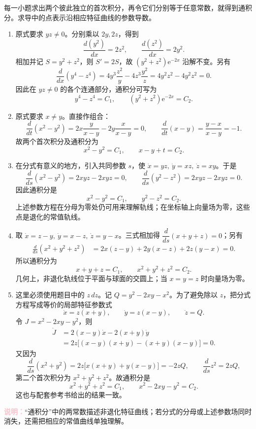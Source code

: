 \documentclass[UTF8,a4paper,11pt]{ctexart}
\newcommand{\e}{\mathrm e}
\newcommand{\note}[1]{\par\smallskip\noindent\textcolor{pink}{\bfseries 说明：}#1\par\smallskip}
\begin{document}
\begin{solution}
每一小题求出两个彼此独立的首次积分，再令它们分别等于任意常数，就得到通积分。求导中的点表示沿相应特征曲线的参数导数。
\begin{enumerate}[label=(\arabic*)]
\item 原式要求 $yz\ne0$。分别乘以 $2y,2z$，得到
\[
\frac{d(y^2)}{dx}=2z^2,\qquad
\frac{d(z^2)}{dx}=2y^2.
\]
相加并记 $S=y^2+z^2$，则 $S'=2S$，故
$(y^2+z^2)\e^{-2x}$ 沿解不变。另有
\[
\frac{d}{dx}(y^4-z^4)
=4y^3\frac{z^2}{y}-4z^3\frac{y^2}{z}
=4y^2z^2-4y^2z^2=0.
\]
因此在 $yz\ne0$ 的各个连通部分，通积分可写为
\[
\boxed{y^4-z^4=C_1,\qquad (y^2+z^2)\e^{-2x}=C_2.}
\]

\item 原式要求 $x\ne y$。直接作组合：
\[
\frac{d}{dt}(x^2-y^2)
=2x\frac{y}{x-y}-2y\frac{x}{x-y}=0,
\qquad
\frac{d}{dt}(x-y)=\frac{y-x}{x-y}=-1.
\]
故两个首次积分及通积分为
\[
\boxed{x^2-y^2=C_1,\qquad x-y+t=C_2.}
\]

\item 在分式有意义的地方，引入共同参数 $s$，使
$\dot x=yz,\ \dot y=xz,\ \dot z=xy$。于是
\[
\frac{d}{ds}(x^2-y^2)=2xyz-2xyz=0,\qquad
\frac{d}{ds}(y^2-z^2)=2xyz-2xyz=0.
\]
因此通积分是
\[
\boxed{x^2-y^2=C_1,\qquad y^2-z^2=C_2.}
\]
上述参数方程在分母为零处仍可用来理解轨线；在坐标轴上向量场为零，这些点是退化的常值轨线。

\item 取 $\dot x=z-y,\ \dot y=x-z,\ \dot z=y-x$。三式相加得
$\dfrac{d}{ds}(x+y+z)=0$；另有
\[
\begin{aligned}
\frac{d}{ds}(x^2+y^2+z^2)
&=2x(z-y)+2y(x-z)+2z(y-x)=0.
\end{aligned}
\]
所以通积分为
\[
\boxed{x+y+z=C_1,\qquad x^2+y^2+z^2=C_2.}
\]
几何上，非退化轨线位于平面与球面的交圆上；当 $x=y=z$ 时向量场为零。

\item 这里必须使用题目中的 $z\,dz$。记
$Q=y^2-2xy-x^2$。为了避免除以 $z$，把分式方程写成等价的局部特征参数式
\[
\dot x=z(x+y),\qquad
\dot y=z(x-y),\qquad
\dot z=Q.
\]
令 $J=x^2-2xy-y^2$，则
\[
\begin{aligned}
\dot J
&=2(x-y)\dot x-2(x+y)\dot y\\
&=2z\bigl[(x-y)(x+y)-(x+y)(x-y)\bigr]=0.
\end{aligned}
\]
又因为
\[
\frac{d}{ds}(x^2+y^2)
=2z\bigl[x(x+y)+y(x-y)\bigr]
=-2zQ,
\qquad
\frac{d}{ds}z^2=2zQ,
\]
第二个首次积分为 $x^2+y^2+z^2$。故通积分是
\[
\boxed{x^2+y^2+z^2=C_1,\qquad
x^2-2xy-y^2=C_2.}
\]
这也与配套参考书给出的结果一致。
\end{enumerate}
\note{“通积分”中的两常数描述非退化特征曲线；若分式的分母或上述参数场同时消失，还需把相应的常值曲线单独理解。}
\end{solution}
\end{document}
